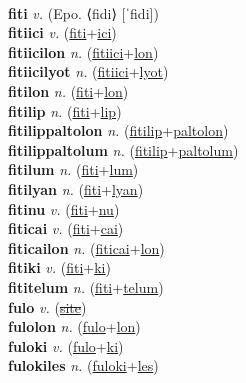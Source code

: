  \label{fikkwelwel} \\
\textbf{fiti} \textit{v.} (Epo. ⟨fidi⟩ [ˈfidi])
 \label{fiti} \\
\textbf{fitiici} \textit{v.} (\hyperref[fiti]{fiti}+\hyperref[ici]{ici})
 \label{fitiici} \\
\textbf{fitiicilon} \textit{n.} (\hyperref[fitiici]{fitiici}+\hyperref[lon]{lon})
 \label{fitiicilon} \\
\textbf{fitiicilyot} \textit{n.} (\hyperref[fitiici]{fitiici}+\hyperref[lyot]{lyot})
 \label{fitiicilyot} \\
\textbf{fitilon} \textit{n.} (\hyperref[fiti]{fiti}+\hyperref[lon]{lon})
 \label{fitilon} \\
\textbf{fitilip} \textit{n.} (\hyperref[fiti]{fiti}+\hyperref[lip]{lip})
 \label{fitilip} \\
\textbf{fitilippaltolon} \textit{n.} (\hyperref[fitilip]{fitilip}+\hyperref[paltolon]{paltolon})
 \label{fitilippaltolon} \\
\textbf{fitilippaltolum} \textit{n.} (\hyperref[fitilip]{fitilip}+\hyperref[paltolum]{paltolum})
 \label{fitilippaltolum} \\
\textbf{fitilum} \textit{n.} (\hyperref[fiti]{fiti}+\hyperref[lum]{lum})
 \label{fitilum} \\
\textbf{fitilyan} \textit{n.} (\hyperref[fiti]{fiti}+\hyperref[lyan]{lyan})
 \label{fitilyan} \\
\textbf{fitinu} \textit{v.} (\hyperref[fiti]{fiti}+\hyperref[nu]{nu})
 \label{fitinu} \\
\textbf{fiticai} \textit{v.} (\hyperref[fiti]{fiti}+\hyperref[cai]{cai})
 \label{fiticai} \\
\textbf{fiticailon} \textit{n.} (\hyperref[fiticai]{fiticai}+\hyperref[lon]{lon})
 \label{fiticailon} \\
\textbf{fitiki} \textit{v.} (\hyperref[fiti]{fiti}+\hyperref[ki]{ki})
 \label{fitiki} \\
\textbf{fititelum} \textit{n.} (\hyperref[fiti]{fiti}+\hyperref[telum]{telum})
 \label{fititelum} \\
\textbf{fulo} \textit{v.} (\hyperref[site]{\sout{site}})
 \label{fulo} \\
\textbf{fulolon} \textit{n.} (\hyperref[fulo]{fulo}+\hyperref[lon]{lon})
 \label{fulolon} \\
\textbf{fuloki} \textit{v.} (\hyperref[fulo]{fulo}+\hyperref[ki]{ki})
 \label{fuloki} \\
\textbf{fulokiles} \textit{n.} (\hyperref[fuloki]{fuloki}+\hyperref[les]{les})
 \label{fulokiles} \\
